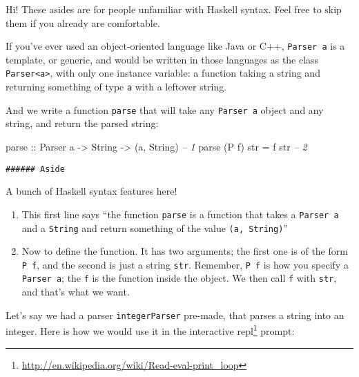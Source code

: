 \documentclass[]{article}
\newenvironment{Shaded}{}{}
\newcommand{\DataTypeTok}[1]{\textcolor[rgb]{0.56,0.13,0.00}{{#1}}}
\newcommand{\CommentTok}[1]{\textcolor[rgb]{0.38,0.63,0.69}{\textit{{#1}}}}
\newcommand{\OtherTok}[1]{\textcolor[rgb]{0.00,0.44,0.13}{{#1}}}
\newcommand{\FunctionTok}[1]{\textcolor[rgb]{0.02,0.16,0.49}{{#1}}}
\newcommand{\NormalTok}[1]{{#1}}
\renewcommand{\href}[2]{#2\footnote{\url{#1}}}
\begin{document}
Hi! These asides are for people unfamiliar with Haskell syntax. Feel free to skip them if you
already are comfortable.

If you've ever used an object-oriented language like Java or C++, \texttt{Parser\ a} is a template,
or generic, and would be written in those languages as the class
\texttt{Parser\textless{}a\textgreater{}}, with only one instance variable: a function taking a
string and returning something of type \texttt{a} with a leftover string.

And we write a function \texttt{parse} that will take any \texttt{Parser\ a} object and any string,
and return the parsed string:

\begin{Shaded}
\begin{Highlighting}[]
\OtherTok{parse ::} \DataTypeTok{Parser} \NormalTok{a }\OtherTok{->} \DataTypeTok{String} \OtherTok{->} \NormalTok{(a, }\DataTypeTok{String}\NormalTok{)              }\CommentTok{-- 1}
\NormalTok{parse (}\DataTypeTok{P} \NormalTok{f) str }\FunctionTok{=} \NormalTok{f str                                 }\CommentTok{-- 2}
\end{Highlighting}
\end{Shaded}

\begin{verbatim}
###### Aside
\end{verbatim}

A bunch of Haskell syntax features here!

\begin{enumerate}
\def\labelenumi{\arabic{enumi}.}
\item
  This first line says ``the function \texttt{parse} is a function that takes a \texttt{Parser\ a}
  and a \texttt{String} and return something of the value \texttt{(a,\ String)}''
\item
  Now to define the function. It has two arguments; the first one is of the form \texttt{P\ f}, and
  the second is just a string \texttt{str}. Remember, \texttt{P\ f} is how you specify a
  \texttt{Parser\ a}; the \texttt{f} is the function inside the object. We then call \texttt{f} with
  \texttt{str}, and that's what we want.
\end{enumerate}

Let's say we had a parser \texttt{integerParser} pre-made, that parses a string into an integer.
Here is how we would use it in the interactive
\href{http://en.wikipedia.org/wiki/Read-eval-print_loop}{repl} prompt:
\end{document}
